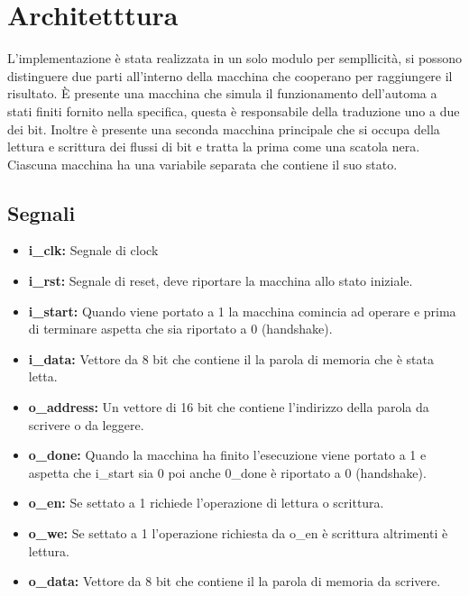 \documentclass{article}
\begin{document}

\section{Architetttura}
L'implementazione è stata realizzata in un solo modulo per sempllicità, si possono distinguere due parti all'interno della macchina che cooperano per raggiungere il risultato. È presente una macchina che simula il funzionamento dell'automa a stati finiti fornito nella specifica, questa è responsabile della traduzione uno a due dei bit. Inoltre è presente una seconda macchina principale che si occupa della lettura e scrittura dei flussi di bit e tratta la prima come una scatola nera. Ciascuna macchina ha una variabile separata che contiene il suo stato.

\subsection{Segnali}
\begin{itemize}
	\item \textbf{i\_clk:} Segnale di clock
	\item \textbf{i\_rst:} Segnale di reset, deve riportare la macchina allo stato iniziale.
	\item \textbf{i\_start:} Quando viene portato a 1 la macchina comincia ad operare e prima di terminare aspetta che sia riportato a 0 (handshake).
	\item \textbf{i\_data:} Vettore da 8 bit che contiene il la parola di memoria che è stata letta.
\end{itemize}

\begin{itemize}
	\item \textbf{o\_address:} Un vettore di 16 bit che contiene l'indirizzo della parola da scrivere o da leggere.
	\item \textbf{o\_done:} Quando la macchina ha finito l'esecuzione viene portato a 1 e aspetta che i\_start sia 0 poi anche 0\_done è riportato a 0 (handshake).
	\item \textbf{o\_en:} Se settato a 1 richiede l'operazione di lettura o scrittura.
	\item \textbf{o\_we:} Se settato a 1 l'operazione richiesta da o\_en è scrittura altrimenti è lettura.
	\item \textbf{o\_data:} Vettore da 8 bit che contiene il la parola di memoria da scrivere.
\end{itemize}
\end{document}
